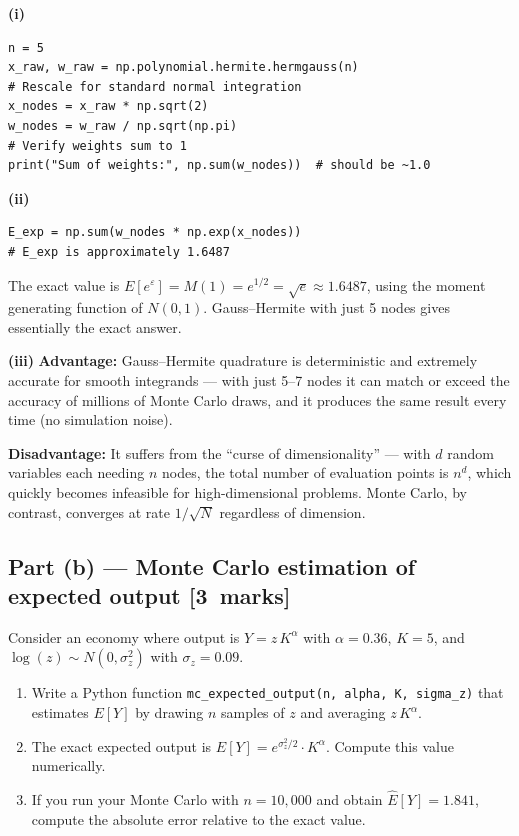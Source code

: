 \documentclass[11pt,a4paper]{article}
\newcommand{\mkpts}[1]{\hfill\textbf{[#1~marks]}}
\begin{document}
\begin{solution}
\textbf{(i)}
\begin{lstlisting}[numbers=none]
n = 5
x_raw, w_raw = np.polynomial.hermite.hermgauss(n)
# Rescale for standard normal integration
x_nodes = x_raw * np.sqrt(2)
w_nodes = w_raw / np.sqrt(np.pi)
# Verify weights sum to 1
print("Sum of weights:", np.sum(w_nodes))  # should be ~1.0
\end{lstlisting}

\textbf{(ii)}
\begin{lstlisting}[numbers=none]
E_exp = np.sum(w_nodes * np.exp(x_nodes))
# E_exp is approximately 1.6487
\end{lstlisting}
The exact value is $E[e^\varepsilon] = M(1) = e^{1/2} = \sqrt{e} \approx 1.6487$, using the moment generating function of $N(0,1)$.  Gauss--Hermite with just 5 nodes gives essentially the exact answer.

\medskip

\textbf{(iii)} \textbf{Advantage:} Gauss--Hermite quadrature is deterministic and extremely accurate for smooth integrands --- with just 5--7 nodes it can match or exceed the accuracy of millions of Monte Carlo draws, and it produces the same result every time (no simulation noise).

\textbf{Disadvantage:} It suffers from the ``curse of dimensionality'' --- with $d$ random variables each needing $n$ nodes, the total number of evaluation points is $n^d$, which quickly becomes infeasible for high-dimensional problems.  Monte Carlo, by contrast, converges at rate $1/\sqrt{N}$ regardless of dimension.
\end{solution}

\subsection*{Part (b) --- Monte Carlo estimation of expected output \mkpts{3}}

Consider an economy where output is $Y = z\,K^\alpha$ with $\alpha = 0.36$, $K = 5$, and $\log(z) \sim N(0, \sigma_z^2)$ with $\sigma_z = 0.09$.

\begin{enumerate}[label=(\roman*),nosep]
\item Write a Python function \texttt{mc\_expected\_output(n, alpha, K, sigma\_z)} that estimates $E[Y]$ by drawing $n$ samples of $z$ and averaging $z\,K^\alpha$.
\item The exact expected output is $E[Y] = e^{\sigma_z^2/2}\cdot K^\alpha$.  Compute this value numerically.
\item If you run your Monte Carlo with $n = 10{,}000$ and obtain $\hat{E}[Y] = 1.841$, compute the absolute error relative to the exact value.
\end{enumerate}
\end{document}
